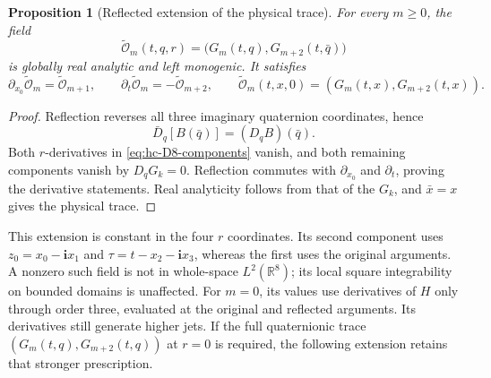 \documentclass[11pt]{article}
\numberwithin{equation}{section}
\newtheorem{proposition}[theorem]{Proposition}
\theoremstyle{definition}
\theoremstyle{remark}
\newcommand{\R}{\mathbb R}
\newcommand{\ii}{\mathbf i}
\begin{document}
\begin{proposition}[Reflected extension of the physical trace]
\label{prop:hc-reflected-extension}
For every \(m\ge0\), the field
\begin{equation}
 \widetilde{\mathcal O}_m(t,q,r)
 =\bigl(G_m(t,q),G_{m+2}(t,\bar q)\bigr)
 \label{eq:hc-reflected-lift}
\end{equation}
is globally real analytic and left monogenic.  It satisfies
\begin{equation}
 \partial_{x_0}\widetilde{\mathcal O}_m
       =\widetilde{\mathcal O}_{m+1},\qquad
 \partial_t\widetilde{\mathcal O}_m
       =-\widetilde{\mathcal O}_{m+2},\qquad
 \widetilde{\mathcal O}_m(t,x,0)=(G_m(t,x),G_{m+2}(t,x)).
 \label{eq:hc-reflected-identities}
\end{equation}
\end{proposition}
\begin{proof}
Reflection reverses all three imaginary quaternion coordinates, hence
\[
 \bar D_q[B(\bar q)]=(D_qB)(\bar q).
\]
Both \(r\)-derivatives in \eqref{eq:hc-D8-components} vanish, and
both remaining components vanish by \(D_qG_k=0\).  Reflection
commutes with \(\partial_{x_0}\) and \(\partial_t\), proving the
derivative statements.  Real analyticity follows from that of the
\(G_k\), and \(\bar x=x\) gives the physical trace.
\end{proof}

This extension is constant in the four \(r\) coordinates. Its second
component uses \(z_0=x_0-\ii x_1\) and
\(\tau=t-x_2-\ii x_3\), whereas the first uses the original
arguments. A nonzero such field is not in whole-space
\(L^2(\R^8)\); its local square integrability on bounded domains
is unaffected. For
\(m=0\), its values use derivatives of \(H\) only through order
three, evaluated at the original and reflected arguments.  Its
derivatives still generate higher jets.  If the full quaternionic
trace \((G_m(t,q),G_{m+2}(t,q))\) at \(r=0\) is required, the
following extension retains that stronger prescription.
\end{document}
